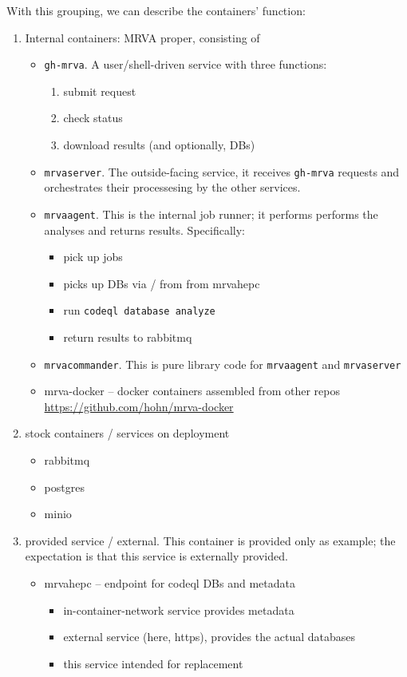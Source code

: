 \documentclass[11pt]{article}
\begin{document}
With this grouping, we can describe the containers' function:
\begin{enumerate}
\item Internal containers:  MRVA proper, consisting of 
\begin{itemize}
\item \texttt{gh-mrva}.  A user/shell-driven service with three functions:
\begin{enumerate}
\item submit request
\item check status
\item download results (and optionally, DBs)
\end{enumerate}
\item \texttt{mrvaserver}.  The outside-facing service, it receives \texttt{gh-mrva} requests
and orchestrates their processesing by the other services.
\item \texttt{mrvaagent}.  This is the internal job runner; it performs performs the
analyses and returns results.  Specifically:
\begin{itemize}
\item pick up jobs
\item picks up DBs via / from from mrvahepc
\item run \texttt{codeql database analyze}
\item return results to rabbitmq
\end{itemize}
\item \texttt{mrvacommander}.  This is pure library code for \texttt{mrvaagent} and \texttt{mrvaserver}
\item mrva-docker -- docker containers assembled from other repos
\url{https://github.com/hohn/mrva-docker}
\end{itemize}

\item stock containers / services on deployment
\begin{itemize}
\item rabbitmq
\item postgres
\item minio
\end{itemize}

\item provided service / external.  This container is provided only as example;
the expectation is that this service is externally provided.

\begin{itemize}
\item mrvahepc -- endpoint for codeql DBs and metadata
\begin{itemize}
\item in-container-network service provides metadata
\item external service (here, https), provides the actual databases
\item this service intended for replacement


\end{itemize}
\end{itemize}
\end{enumerate}
\end{document}
